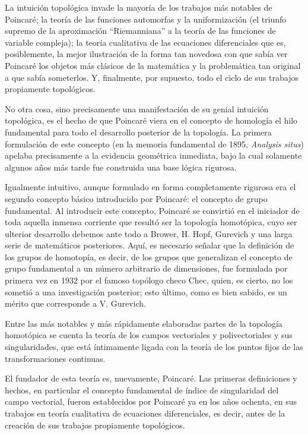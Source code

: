 \documentclass[a4paper, 12pt]{article}
\begin{document}
La intuición topológica invade la mayoría de  los trabajos más notables de Poincaré; la teoría de  las funciones automorfas y la uniformización (el triunfo supremo de la aproximación ``Riemanniana'' a la teoría de las funciones de variable compleja); la teoría cualitativa de las ecuaciones diferenciales que es,  posiblemente, la mejor ilustración de la forma tan novedosa con que sabía ver Poincaré los objetos más clásicos de la matemática y la problemática tan original a que sabía someterlos. Y, finalmente, por supuesto,
todo el ciclo de sus trabajos propiamente topológicos.

No otra cosa, sino precisamente una manifestación de su genial intuición topológica, es el hecho  de que Poincaré viera en el concepto de homología el hilo fundamental para todo el desarrollo posterior de la topología. La primera formulación de este concepto (en la memoria fundamental de 1895, {\it Analysis situs}) apelaba precisamente a la evidencia geométrica inmediata, bajo la cual solamente algunos años más tarde fue construida una base lógica rigurosa.

Igualmente intuitivo, aunque formulado en forma completamente rigurosa era el segundo concepto básico introducido por Poincaré: el concepto de grupo  fundamental. Al introducir este concepto, Poincaré se convirtió en el iniciador de toda aquella inmensa corriente que resultó ser la topología homotópica, cuyo	ser ulterior desarrollo debemos ante todo a Brower, H.  Hopf, Gurevich y una larga serie de matemáticos posteriores. Aquí, es necesario señalar que la definición de los grupos de homotopía, es decir, de los grupos  que generalizan el concepto de grupo fundamental a un
número arbitrario de dimensiones, fue formulada por  primera vez en 1932 por el famoso topólogo checo Chec, quien, es cierto, no los sometió a una investigación  posterior; esto último, como es bien sabido, es un mérito que corresponde a V. Gurevich.

Entre las más notables y más rápidamente elaboradas partes de la topología homotópica se cuenta la  teoría de los campos vectoriales y polivectoriales y  sus singularidades, que está íntimamente ligada con la teoría de los puntos fijos de las transformaciones continuas.

El fundador de esta teoría es, nuevamente, Poincaré. Las primeras definiciones y hechos, en particular el concepto fundamental de índice de singularidad del campo vectorial, fueron establecidos por Poincaré ya  en los años ochenta, en sus trabajos en teoría cualitativa de ecuaciones diferenciales, es decir, antes de  la creación de sus trabajos propiamente topológicos.
\end{document}
